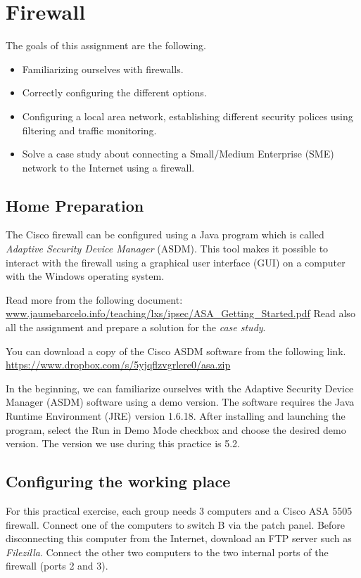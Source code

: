 \chapter{Firewall}

The goals of this assignment are the following.

\begin{itemize}
\item Familiarizing ourselves with firewalls.
\item Correctly configuring the different options.
\item Configuring a local area network, establishing different security polices using filtering and traffic monitoring.
\item Solve a case study about connecting a Small/Medium Enterprise (SME) network to the Internet using a firewall.
\end{itemize}

\section{Home Preparation}

The Cisco firewall can be configured using a Java program which is called \emph{Adaptive Security Device Manager} (ASDM). This tool makes it possible to interact with the firewall using a graphical user interface (GUI) on a computer with the Windows operating system.

Read more from the following document:
\url{www.jaumebarcelo.info/teaching/lxs/ipsec/ASA_Getting_Started.pdf}
Read also all the assignment and prepare a solution for the \emph{case study}.

You can download a copy of the Cisco ASDM software from the following link.
\url{https://www.dropbox.com/s/5yjqflzvgrlere0/asa.zip}

In the beginning, we can familiarize ourselves with the Adaptive Security Device Manager (ASDM) software using a demo version. The software requires the Java Runtime Environment (JRE) version 1.6.18. After installing and launching the program, select the {\sf Run in Demo Mode} checkbox and choose the desired demo version. The version we use during this practice is 5.2.


\section{Configuring the working place}

For this practical exercise, each group needs 3 computers and a Cisco ASA 5505 firewall. Connect one of the computers to switch B via the patch panel. Before disconnecting this computer from the Internet, download an FTP server such as \emph{Filezilla}. Connect the other two computers to the two internal ports of the firewall (ports 2 and 3).

